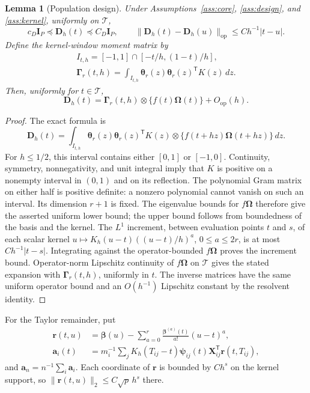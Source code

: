 \documentclass[12pt]{article}
\newtheorem{lemma}{Lemma}
\newcommand{\ba}{{\mathbf a}}
\newcommand{\br}{{\mathbf r}}
\newcommand{\bD}{{\mathbf D}}
\newcommand{\bI}{{\mathbf I}}
\newcommand{\bX}{{\mathbf X}}
\newcommand{\bbeta}  {\boldsymbol{\beta}}
\newcommand{\btheta}  {\boldsymbol{\theta}}
\newcommand{\bpsi} {\boldsymbol{{\mathbf \psi}}}
\newcommand{\bGamma} {\boldsymbol{\Gamma}}
\newcommand{\bOmega} {\boldsymbol{\Omega}}
\newcommand{\trans}{{\scriptscriptstyle\mathsf{T}}}
\numberwithin{equation}{section}
\begin{document}
\begin{lemma}[Population design]\label{lem:hd-population}
Under Assumptions~\ref{ass:core}, \ref{ass:design}, and
\ref{ass:kernel}, uniformly on $\mathcal T$,
\[
c_D\bI_P\preceq\bD_h(t)\preceq C_D\bI_P,
\qquad
\|\bD_h(t)-\bD_h(u)\|_{\mathrm{op}}
\le Ch^{-1}|t-u|.
\]
Define the kernel-window moment matrix by
\[
\begin{gathered}
I_{t,h}=[-1,1]\cap[-t/h,(1-t)/h],\\
\bGamma_r(t,h)=\int_{I_{t,h}}
\btheta_r(z)\btheta_r(z)^\trans K(z)\,dz.
\end{gathered}
\]
Then, uniformly for $t\in\mathcal T$,
\[
\bD_h(t)=\bGamma_r(t,h)\otimes\{f(t)\bOmega(t)\}
+O_{\mathrm{op}}(h).
\]
\end{lemma}

\begin{proof}
The exact formula is
\[
\bD_h(t)=\int_{I_{t,h}}\btheta_r(z)\btheta_r(z)^\trans K(z)
\otimes\{f(t+hz)\bOmega(t+hz)\}\,dz.
\]
For $h\le1/2$, this interval contains either $[0,1]$ or $[-1,0]$.
Continuity, symmetry, nonnegativity, and unit integral imply that $K$
is positive on a nonempty interval in $(0,1)$ and on its reflection.
The polynomial Gram matrix on either half is positive definite:
a nonzero polynomial cannot vanish on such an interval.  Its dimension
$r+1$ is fixed.  The eigenvalue bounds for $f\bOmega$ therefore give
the asserted uniform lower bound; the upper bound
follows from boundedness of the basis and the kernel.
The $L^1$ increment, between evaluation points $t$ and $s$, of each
scalar kernel $u\mapsto K_h(u-t)((u-t)/h)^a$, $0\le a\le2r$,
is at most $Ch^{-1}|t-s|$.
Integrating against the operator-bounded $f\bOmega$ proves the
increment bound. Operator-norm Lipschitz continuity of $f\bOmega$
on $\mathcal T$ gives the stated expansion with $\bGamma_r(t,h)$,
uniformly in $t$.  The inverse matrices have
the same uniform operator bound and an $O(h^{-1})$ Lipschitz constant
by the resolvent identity.
\end{proof}

For the Taylor remainder, put
\[
\begin{aligned}
\br(t,u)&=\bbeta(u)-\sum_{a=0}^r
\frac{\bbeta^{(a)}(t)}{a!}(u-t)^a,
\\
\ba_i(t)&=m_i^{-1}\sum_jK_h(T_{ij}-t)
\bpsi_{ij}(t)\bX_{ij}^\trans\br(t,T_{ij}),
\end{aligned}
\]
and $\ba_n=n^{-1}\sum_i\ba_i$. Each coordinate of $\br$ is bounded
by $Ch^s$ on the kernel support, so
$\|\br(t,u)\|_2\le C\sqrt p\,h^s$ there.
\end{document}
